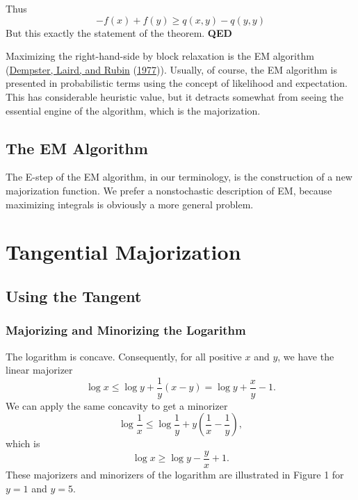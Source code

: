 \documentclass[
  12pt,
]{book}
\begin{document}
Thus
\[
-f(x)+f(y)\geq q(x,y)-q(y,y)
\]
But this exactly the statement of the theorem.
\textbf{QED}

Maximizing the right-hand-side
by block relaxation is the EM algorithm (\protect\hyperlink{ref-dempster_laird_rubin_77}{Dempster, Laird, and Rubin} (\protect\hyperlink{ref-dempster_laird_rubin_77}{1977})). Usually,
of course, the EM algorithm is presented in probabilistic terms
using the concept of likelihood and expectation. This has
considerable heuristic value, but it detracts somewhat from
seeing the essential engine of the algorithm, which is the
majorization.

\hypertarget{the-em-algorithm-1}{%
\section{The EM Algorithm}\label{the-em-algorithm-1}}

The E-step of the EM algorithm,
in our terminology, is the construction of a new majorization
function. We prefer a nonstochastic description of EM, because
maximizing integrals is obviously a more general problem.

\hypertarget{tangential-majorization}{%
\chapter{Tangential Majorization}\label{tangential-majorization}}

\hypertarget{using-the-tangent}{%
\section{Using the Tangent}\label{using-the-tangent}}

\hypertarget{majorizing-and-minorizing-the-logarithm}{%
\subsection{Majorizing and Minorizing the Logarithm}\label{majorizing-and-minorizing-the-logarithm}}

The logarithm is concave. Consequently, for all positive \(x\) and \(y\), we have the linear majorizer
\[
\log x\leq\log y+\frac{1}{y}(x-y)=\log y+\frac{x}{y}-1.
\]
We can apply the same concavity to get a minorizer
\[
\log\frac{1}{x}\leq\log\frac{1}{y}+y(\frac{1}{x}-\frac{1}{y}),
\]
which is
\[
\log x\geq \log y-\frac{y}{x}+1.
\]
These majorizers and minorizers of the logarithm are illustrated in Figure 1 for \(y=1\) and \(y=5\).
\end{document}
